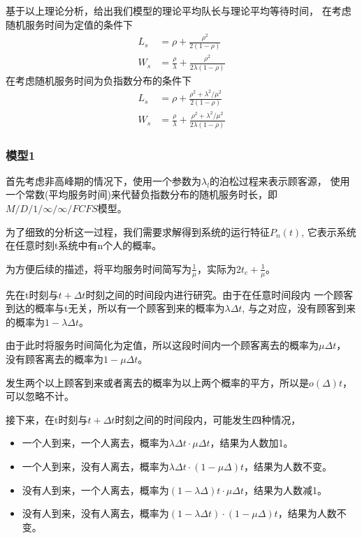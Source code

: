 \documentclass{article}
\begin{document}
    基于以上理论分析，给出我们模型的理论平均队长与理论平均等待时间，
    在考虑随机服务时间为定值的条件下
    \begin{equation}
        \begin{aligned}
            L_s & =\rho +\frac{\rho^2 }{2(1-\rho)} \\
            W_s &=\frac{\rho}{\lambda} +\frac{\rho^2}{2\lambda (1-\rho)}
        \end{aligned}
    \end{equation}
    在考虑随机服务时间为负指数分布的条件下
    \begin{equation}
        \begin{aligned}
            L_s & =\rho +\frac{\rho^2 +\lambda^2 /\mu^2}{2(1-\rho)} \\
            W_s &=\frac{\rho}{\lambda} +\frac{\rho^2 +\lambda^2 /\mu^2}{2\lambda (1-\rho)}
        \end{aligned}
    \end{equation}

\subsubsection{模型1}
首先考虑非高峰期的情况下，使用一个参数为$\lambda_{l}$的泊松过程来表示顾客源，
使用一个常数(平均服务时间)来代替负指数分布的随机服务时长，即$M/D/1/\infty/\infty/FCFS$模型。

为了细致的分析这一过程，我们需要求解得到系统的运行特征$P_n(t)$,
它表示系统在任意时刻t系统中有n个人的概率。

为方便后续的描述，将平均服务时间简写为$\frac{1}{\mu}$，实际为$2t_c+\frac{1}{\mu}$。

先在t时刻与$t+\Delta t$时刻之间的时间段内进行研究。由于在任意时间段内
一个顾客到达的概率与t无关，所以有一个顾客到来的概率为$\lambda \Delta t$,
与之对应，没有顾客到来的概率为$1- \lambda \Delta t$。

由于此时将服务时间简化为定值，所以这段时间内一个顾客离去的概率为$\mu \Delta t$，
没有顾客离去的概率为$1-\mu \Delta t$。

发生两个以上顾客到来或者离去的概率为以上两个概率的平方，所以是$o(\Delta)t$，可以忽略不计。

接下来，在t时刻与$t+\Delta t$时刻之间的时间段内，可能发生四种情况，
\begin{itemize}
\item 一个人到来，一个人离去，概率为$\lambda \Delta t \cdot \mu \Delta t$，结果为人数加1。
\item 一个人到来，没有人离去，概率为$\lambda \Delta t \cdot (1-\mu \Delta) t$，结果为人数不变。
\item 没有人到来，一个人离去，概率为$(1-\lambda \Delta) t \cdot \mu \Delta t$，结果为人数减1。
\item 没有人到来，没有人离去，概率为$(1-\lambda \Delta t) \cdot (1-\mu \Delta) t$，结果为人数不变。
\end{itemize}
\end{document}
